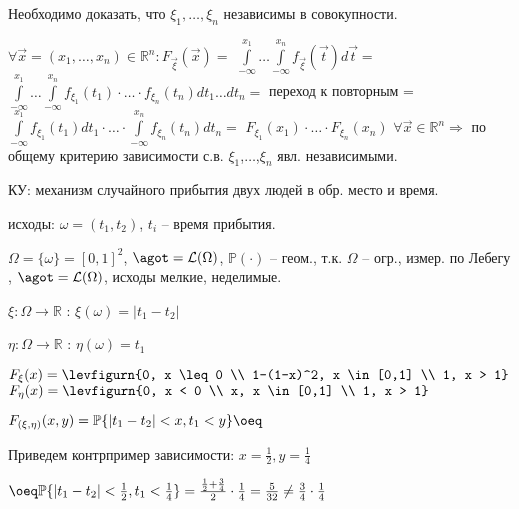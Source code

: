\begin{proofs}
\begin{dokvo}
		Необходимо доказать, что $\xi_1, \ldots, \xi_n$ независимы в совокупности.
		
		$\forall \overrightarrow{x} = (x_1, \ldots, x_n) \in \mathbb{R}^n : F_{\overrightarrow{\xi}}(\overrightarrow{x}) = $
		$\int\limits_{-\infty}^{x_1} \ldots \int\limits_{-\infty}^{x_n} f_{\overrightarrow{\xi}}(\overrightarrow{t})d \overrightarrow{t} = $
		$\int\limits_{-\infty}^{x_1} \ldots \int\limits_{-\infty}^{x_n} f_{\xi_1}(t_1) \cdot \ldots \cdot f_{\xi_n}(t_n)dt_1 \ldots dt_n =$ переход к повторным =
		$\int\limits_{-\infty}^{x_1} f_{\xi_1}(t_1)dt_1 \cdot \ldots \cdot \int\limits_{-\infty}^{x_n} f_{\xi_n}(t_n)dt_n =$
		$F_{\xi_1}(x_1) \cdot \ldots \cdot F_{\xi_n}(x_n)$  $\forall \overrightarrow{x} \in \mathbb{R}^n  \Rightarrow$ по общему критерию зависимости с.в. $\xi_1$,$\dots$,$\xi_n$ явл. независимыми.
	\end{dokvo}
\end{proofs}

\begin{example}
	КУ: механизм случайного прибытия двух людей в обр. место и время.
	
	исходы: $\omega = (t_1,t_2)$, $t_i$ -- время прибытия.
	
	$\Omega = \{\omega\} = [0,1]^2$, $\agot = \mathcal{L}(\Omega)$, 
	$\mathbb{P}(\cdot)$ -- геом., т.к. $\Omega$ -- огр., измер. по Лебегу
	, $\agot = \mathcal{L}(\Omega)$, исходы мелкие, неделимые.
	
	$\xi:\Omega \to \mathbb{R}$ : $\xi(\omega) = |t_1 - t_2|$
	
	$\eta:\Omega \to \mathbb{R}$ : $\eta(\omega) = t_1$
	
	$F_{\xi}(x) = \levfigurn{0, x \leq 0 \\ 1-(1-x)^2, x \in [0,1] \\ 1, x > 1}$
	$F_{\eta}(x) = \levfigurn{0, x < 0 \\ x, x \in [0,1] \\ 1, x > 1}$
	
	$F_{(\xi,\eta)}(x,y) = \mathbb{P}\{|t_1 - t_2| < x, t_1 < y\} \oeq$
	
	Приведем контрпример зависимости: $x = \frac{1}{2}, y = \frac{1}{4}$
	
	$\oeq \mathbb{P}\{|t_1 - t_2| < \frac{1}{2}, t_1 < \frac{1}{4}\} = \frac{\frac{1}{2} + \frac{3}{4}}{2} \cdot \frac{1}{4} = \frac{5}{32} \neq \frac{3}{4} \cdot \frac{1}{4}$
\end{example}



